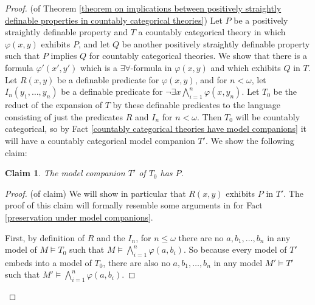\documentclass{article}
\newtheorem{claim}{Claim}
\theoremstyle{definition}
\theoremstyle{definition}
\theoremstyle{definition}
\begin{document}
\begin{proof}(of Theorem \ref{theorem on implications between positively straightly definable properties in countably categorical theories}) Let $P$ be a positively straightly definable property and $T$ a countably categorical theory in which $\varphi(x, y)$ exhibits $P$, and let $Q$ be another positively straightly definable property such that $P$ implies $Q$ for countably categorical theories. We show that there is a formula $\varphi'(x', y')$ which is a $\exists\forall$-formula in $\varphi(x, y)$ and which exhibits $Q$ in $T$. Let $R(x,y)$ be a definable predicate for $\varphi(x,y)$, and for $n < \omega$, let $I_{n}(y_{1}, \ldots, y_{n})$ be a definable predicate for $\neg \exists x \bigwedge^{n}_{i=1} \varphi(x, y_{n})$. Let $T_{0}$ be the reduct of the expansion of $T$ by these definable predicates to the language consisting of just the predicates $R$ and $I_{n}$ for $n < \omega$. Then $T_{0}$ will be countably categorical, so by Fact \ref{countably categorical theories have model companions} it will have a countably categorical model companion $T'$. We show the following claim:

\begin{claim}
The model companion $T'$ of $T_{0}$ has $P$.
\end{claim}

\begin{proof}(of claim)
We will show in particular that $R(x, y)$ exhibits $P$ in $T'$. The proof of this claim will formally resemble some arguments in \cite{bodirsky2025taking} for Fact \ref{preservation under model companions}.

First, by definition of $R$ and the $I_{n}$, for $n \leq \omega$ there are no $a, b_{1}, \ldots, b_{n}$ in any model of $M\models T_{0}$ such that $M \models \bigwedge^{n}_{i=1} \varphi(a, b_{i})$. So because every model of $T'$ embeds into a model of $T_{0}$, there are also no $a, b_{1}, \ldots, b_{n}$ in any model $M' \models T'$ such that $M' \models \bigwedge^{n}_{i=1} \varphi(a, b_{i})$. 


\end{proof}
\end{proof}
\end{document}
